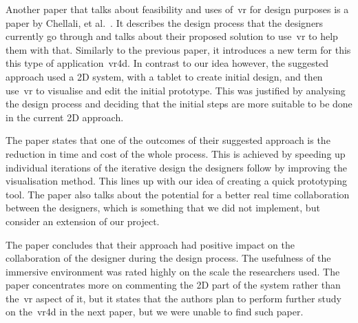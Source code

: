 Another paper that talks about feasibility and uses of~\acrshort{vr} for design purposes is a paper by Chellali, et al.~\cite{chellali2013}. It describes the design process that the designers currently go through and talks about their proposed solution to use~\acrshort{vr} to help them with that. Similarly to the previous paper, it introduces a new term for this this type of application~\acrfull{vr4d}. In contrast to our idea however, the suggested approach used a 2D system, with a tablet to create initial design, and then use~\acrshort{vr} to visualise and edit the initial prototype. This was justified by analysing the design process and deciding that the initial steps are more suitable to be done in the current 2D approach. 

The paper states that one of the outcomes of their suggested approach is the reduction in time and cost of the whole process. This is achieved by speeding up individual iterations of the iterative design the designers follow by improving the visualisation method. This lines up with our idea of creating a quick prototyping tool. The paper also talks about the potential for a better real time collaboration between the designers, which is something that we did not implement, but consider an extension of our project.


The paper concludes that their approach had positive impact on the collaboration of the designer during the design process. The usefulness of the immersive environment was rated highly on the scale the researchers used. The paper concentrates more on commenting the 2D part of the system rather than the~\acrshort{vr} aspect of it, but it states that the authors plan to perform further study on the~\acrshort{vr4d} in the next paper, but we were unable to find such paper.